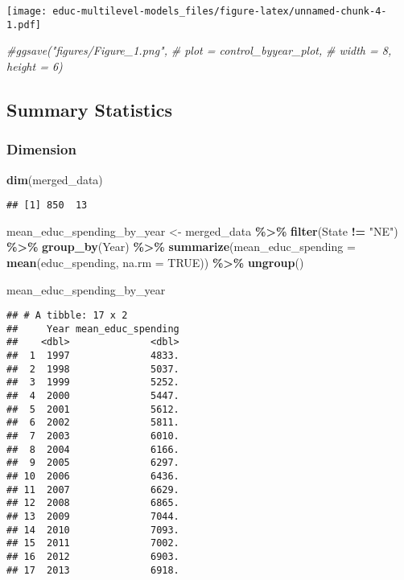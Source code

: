 \documentclass[
]{article}
\newenvironment{Shaded}{\begin{snugshade}}{\end{snugshade}}
\newcommand{\AttributeTok}[1]{\textcolor[rgb]{0.13,0.29,0.53}{#1}}
\newcommand{\CommentTok}[1]{\textcolor[rgb]{0.56,0.35,0.01}{\textit{#1}}}
\newcommand{\ConstantTok}[1]{\textcolor[rgb]{0.56,0.35,0.01}{#1}}
\newcommand{\FunctionTok}[1]{\textcolor[rgb]{0.13,0.29,0.53}{\textbf{#1}}}
\newcommand{\NormalTok}[1]{#1}
\newcommand{\OtherTok}[1]{\textcolor[rgb]{0.56,0.35,0.01}{#1}}
\newcommand{\SpecialCharTok}[1]{\textcolor[rgb]{0.81,0.36,0.00}{\textbf{#1}}}
\newcommand{\StringTok}[1]{\textcolor[rgb]{0.31,0.60,0.02}{#1}}
\begin{document}
\texttt{[image: educ-multilevel-models\_files/figure-latex/unnamed-chunk-4-1.pdf]}

\begin{Shaded}
\begin{Highlighting}[]
\CommentTok{\#ggsave("figures/Figure\_1.png", }
\CommentTok{\#       plot = control\_byyear\_plot, }
\CommentTok{\#       width = 8, height = 6)}
\end{Highlighting}
\end{Shaded}

\hypertarget{summary-statistics}{%
\subsection{Summary Statistics}\label{summary-statistics}}

\hypertarget{dimension}{%
\subsubsection{Dimension}\label{dimension}}

\begin{Shaded}
\begin{Highlighting}[]
\FunctionTok{dim}\NormalTok{(merged\_data)}
\end{Highlighting}
\end{Shaded}

\begin{verbatim}
## [1] 850  13
\end{verbatim}

\begin{Shaded}
\begin{Highlighting}[]
\NormalTok{mean\_educ\_spending\_by\_year }\OtherTok{\textless{}{-}}\NormalTok{ merged\_data }\SpecialCharTok{\%\textgreater{}\%}
  \FunctionTok{filter}\NormalTok{(State }\SpecialCharTok{!=} \StringTok{"NE"}\NormalTok{) }\SpecialCharTok{\%\textgreater{}\%}          
  \FunctionTok{group\_by}\NormalTok{(Year) }\SpecialCharTok{\%\textgreater{}\%}
  \FunctionTok{summarize}\NormalTok{(}\AttributeTok{mean\_educ\_spending =} \FunctionTok{mean}\NormalTok{(educ\_spending, }\AttributeTok{na.rm =} \ConstantTok{TRUE}\NormalTok{)) }\SpecialCharTok{\%\textgreater{}\%}
  \FunctionTok{ungroup}\NormalTok{()}

\NormalTok{mean\_educ\_spending\_by\_year}
\end{Highlighting}
\end{Shaded}

\begin{verbatim}
## # A tibble: 17 x 2
##     Year mean_educ_spending
##    <dbl>              <dbl>
##  1  1997              4833.
##  2  1998              5037.
##  3  1999              5252.
##  4  2000              5447.
##  5  2001              5612.
##  6  2002              5811.
##  7  2003              6010.
##  8  2004              6166.
##  9  2005              6297.
## 10  2006              6436.
## 11  2007              6629.
## 12  2008              6865.
## 13  2009              7044.
## 14  2010              7093.
## 15  2011              7002.
## 16  2012              6903.
## 17  2013              6918.
\end{verbatim}
\end{document}
